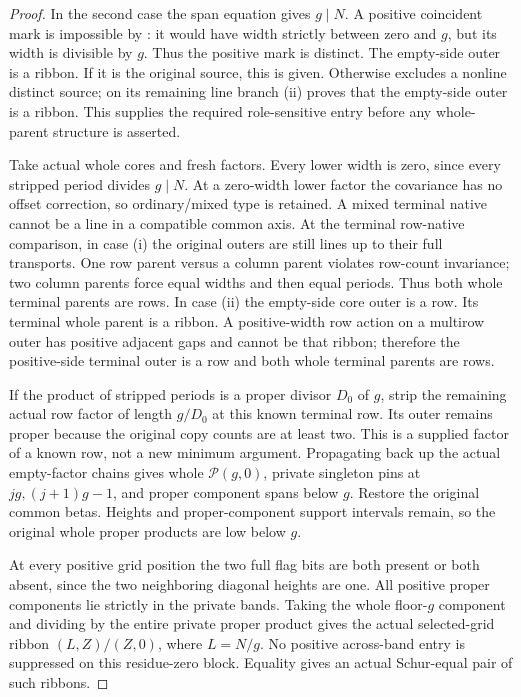 \documentclass[11pt,a4paper]{amsart}
\numberwithin{equation}{section}
\theoremstyle{plain}
\theoremstyle{definition}
\begin{document}
\begin{proof}
In the second case the span equation gives \(g\mid N\).
A positive coincident mark is impossible by
: it would have width strictly between zero
and \(g\), but its width is divisible by \(g\).  Thus the positive mark is
distinct.  The empty-side outer is a ribbon.  If it is the original source,
this is given.  Otherwise  excludes a nonline
distinct source; on its remaining line branch
(ii) proves that the empty-side outer is a ribbon.
This supplies the required role-sensitive entry before any whole-parent
structure is asserted.

Take actual whole cores and fresh factors.  Every lower width is zero,
since every stripped period divides \(g\mid N\).  At a zero-width lower
factor the covariance has no offset correction, so ordinary/mixed type
is retained.  A mixed terminal native cannot be a line in a compatible
common axis.  At the terminal row-native comparison, in case (i) the
original outers are still lines up to their full transports.  One row
parent versus a column parent violates row-count invariance; two column
parents force equal widths and then equal periods.  Thus both whole
terminal parents are rows.  In case (ii) the empty-side core outer is a
row.  Its terminal whole parent is a ribbon.  A positive-width row action
on a multirow outer has positive adjacent gaps and cannot be that ribbon;
therefore the positive-side terminal outer is a row and both whole
terminal parents are rows.

If the product of stripped periods is a proper divisor \(D_0\) of \(g\),
strip the remaining actual row factor of length \(g/D_0\) at this known
terminal row.  Its outer remains proper because the original copy counts
are at least two.  This is a supplied factor of a known row, not a new
minimum argument.  Propagating back up the actual empty-factor chains gives
whole \(\mathcal P(g,0)\), private singleton pins at \(jg,(j+1)g-1\), and proper
component spans below \(g\).  Restore the original common betas.  Heights
and proper-component support intervals remain, so the original whole
proper products are low below \(g\).

At every positive grid position the two full flag bits are both present
or both absent, since the two neighboring diagonal heights are one.
All positive proper components lie strictly in the private bands.
Taking the whole floor-\(g\) component and dividing by the entire private
proper product gives the actual selected-grid ribbon
\((L,Z)/(Z,0)\), where \(L=N/g\).  No positive across-band entry is suppressed
on this residue-zero block.  Equality gives an actual Schur-equal pair of
such ribbons.


\end{proof}
\end{document}
